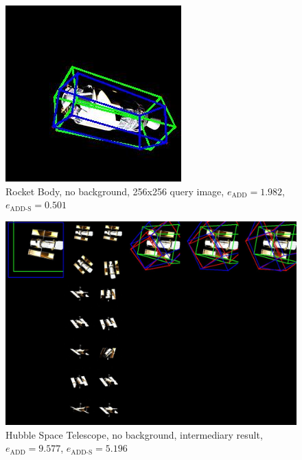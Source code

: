 \begin{figure}[h]
\begin{minipage}{0.45\linewidth}
        \includegraphics[width=\linewidth]{data/fig10.jpg} %
        \caption{Rocket Body, no background, 256x256 query image, $e_\mathrm{ADD}=1.982$, $e_{\mathrm{ADD}\text{-}\mathrm{S}}=0.501$ }
        \label{fig:image2}
    \end{minipage}
\end{figure}

\begin{figure}[ht]
  \centering
  \includegraphics[width=\textwidth]{data/fig11.jpg}
  \caption{Hubble Space Telescope, no background, intermediary result, $e_\mathrm{ADD}=9.577$, $e_{\mathrm{ADD}\text{-}\mathrm{S}}=5.196$}
  \label{fig:cap1}
\end{figure}

